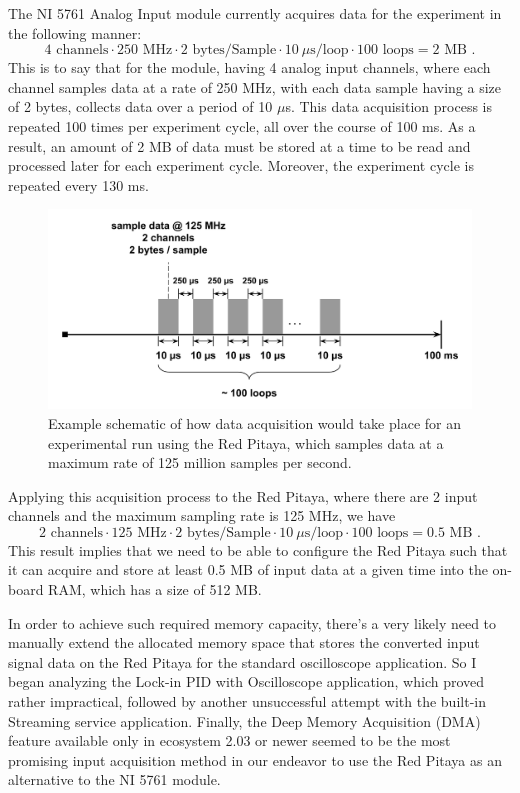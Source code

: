 The NI 5761 Analog Input module currently acquires data for the experiment in the following manner:
\begin{equation}\label{eq:ni_memory}
    4 \text{ channels} \cdot 250 \text{ MHz} \cdot 2 \text{ bytes/Sample} \cdot 10\ \mu\text{s/loop} \cdot 100 \text{ loops} = 2 \text{ MB .}
\end{equation}
This is to say that for the module, having 4 analog input channels, where each channel samples data at a rate of 250 MHz, with each data sample having a size of 2 bytes, collects data over a period of 10 $\mu$s. This data acquisition process is repeated 100 times per experiment cycle, all over the course of 100 ms. As a result, an amount of 2 MB of data must be stored at a time to be read and processed later for each experiment cycle. Moreover, the experiment cycle is repeated every 130 ms.

\begin{figure}[ht]
    \centering
    \includegraphics[width=0.85\columnwidth]{images/chapter_2/acquisition.png}
    \caption{Example schematic of how data acquisition would take place for an experimental run using the Red Pitaya, which samples data at a maximum rate of 125 million samples per second.}
    \label{fig:ch2_acquisition}
\end{figure}

Applying this acquisition process to the Red Pitaya, where there are 2 input channels and the maximum sampling rate is 125 MHz, we have
\begin{equation}\label{eq:rp_memory}
    2 \text{ channels} \cdot 125 \text{ MHz} \cdot 2 \text{ bytes/Sample} \cdot 10\ \mu\text{s/loop} \cdot 100 \text{ loops} = 0.5 \text{ MB .}
\end{equation}
This result implies that we need to be able to configure the Red Pitaya such that it can acquire and store at least 0.5 MB of input data at a given time into the on-board RAM, which has a size of 512 MB. 

In order to achieve such required memory capacity, there's a very likely need to manually extend the allocated memory space that stores the converted input signal data on the Red Pitaya for the standard oscilloscope application. So I began analyzing the Lock-in PID with Oscilloscope application, which proved rather impractical, followed by another unsuccessful attempt with the built-in Streaming service application. Finally, the Deep Memory Acquisition (DMA) feature available only in ecosystem 2.03 or newer seemed to be the most promising input acquisition method in our endeavor to use the Red Pitaya as an alternative to the NI 5761 module.

